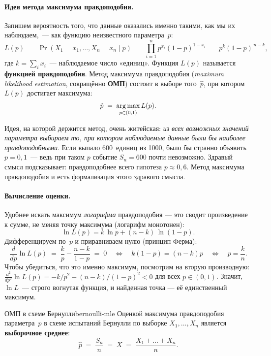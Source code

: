 \paragraph{Идея метода максимума правдоподобия.}
Запишем вероятность того, что данные оказались именно такими, как мы их
наблюдаем,~--- как функцию неизвестного параметра~$p$:
\begin{equation}\label{eq:like-bern}
L(p)\;=\;\Pr(X_1=x_1,\dots,X_n=x_n\mid p)
   \;=\;\prod_{i=1}^{n}p^{x_i}(1-p)^{1-x_i}
   \;=\;p^{k}(1-p)^{\,n-k},
\end{equation}
где $k=\sum_i x_i$~--- наблюдаемое число «единиц». Функция $L(p)$
называется \textbf{функцией правдоподобия}. Метод
максимума правдоподобия (\emph{maximum likelihood estimation},
сокращённо \textbf{ОМП}) состоит в выборе того~$\hat p$, при котором
$L(p)$ достигает максимума:
\[
\hat p\;=\;\operatorname*{arg\,max}_{p\in(0,1)} L(p).
\]

\begin{notebox}[title={Почему именно максимум правдоподобия?}]
Идея, на которой держится метод, очень житейская: \emph{из всех
возможных значений параметра выбираем то, при котором наблюдаемые
данные были бы наиболее правдоподобными}. Если выпало 600~единиц из
1000, было бы странно объявить $p=0{,}1$~--- ведь при таком $p$ событие
$S_n=600$ почти невозможно. Здравый смысл подсказывает: правдоподобнее
всего гипотеза $p\approx 0{,}6$. Метод максимума правдоподобия и есть
формализация этого здравого смысла.
\end{notebox}

\paragraph{Вычисление оценки.}
Удобнее искать максимум \emph{логарифма} правдоподобия — это сводит
произведение к сумме, не меняя точку максимума (логарифм монотонен):
\begin{equation}\label{eq:loglike-bern}
\ln L(p)=k\,\ln p+(n-k)\,\ln(1-p).
\end{equation}
Дифференцируем по~$p$ и приравниваем нулю (принцип Ферма):
\[
\frac{d}{dp}\ln L(p)\;=\;\frac{k}{p}-\frac{n-k}{1-p}\;=\;0
\quad\Longleftrightarrow\quad k(1-p)=(n-k)p
\quad\Longleftrightarrow\quad p=\frac{k}{n}.
\]
Чтобы убедиться, что это именно максимум, посмотрим на вторую
производную:
$\frac{d^{2}}{dp^{2}}\ln L(p)=-k/p^{2}-(n-k)/(1-p)^{2}<0$
для всех $p\in(0,1)$. Значит, $\ln L$~--- строго вогнутая функция, и
найденная точка — её единственный максимум.

\begin{theorem}{ОМП в схеме Бернулли}{bernoulli-mle}
Оценкой максимума правдоподобия параметра~$p$ в схеме испытаний
Бернулли по выборке $X_1,\dots,X_n$ является
\textbf{выборочное среднее}:
\begin{equation}\label{eq:bern-mle}
\boxed{\;\hat p \;=\; \frac{S_n}{n} \;=\; \overline{X} \;=\;
\frac{X_1+\dots+X_n}{n}.\;}
\end{equation}
\end{theorem}

